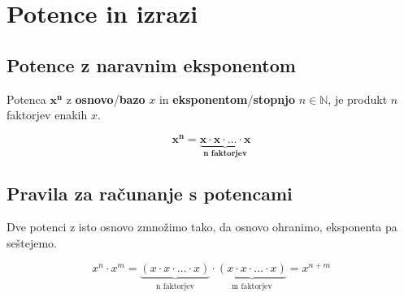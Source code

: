 \chapter{Potence in izrazi}
\section{Potence z naravnim eksponentom}


            Potenca $\mathbf{x^n}$ z \textbf{osnovo}/\textbf{bazo} $x$ in \textbf{eksponentom}/\textbf{stopnjo} $n \in \mathbb{N}$, je produkt $n$ faktorjev enakih $x$.

            $$ \mathbf{x^n=\underbrace{x\cdot x\cdot \ldots \cdot x}_\text{n faktorjev}}  $$
        
                





                
    

    
    
        \section{Pravila za računanje s potencami}

                    Dve potenci z isto osnovo zmnožimo tako, da osnovo ohranimo, eksponenta pa seštejemo.

            $$ x^n \cdot x^m=\underbrace{(x\cdot x\cdot\ldots\cdot x)}_\text{n faktorjev}\cdot\underbrace{(x\cdot x\cdot\ldots\cdot x)}_\text{m faktorjev}=x^{n+m}$$
            
